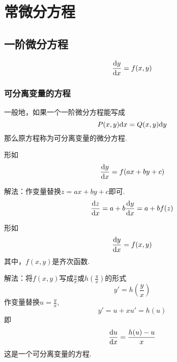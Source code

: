 \chapter{常微分方程}
\section{一阶微分方程}
\sj
\begin{equation}
	\frac{{\rm{d}} y}{{\rm{d}} x}=f(x,y)
\end{equation} 
\subsection{可分离变量的方程}
\sj
一般地，如果一个一阶微分方程能写成
\begin{equation}
	P(x,y){\rm{d}} x=Q(x,y) {\rm{d}} y
\end{equation}
那么原方程称为可分离变量的微分方程.

\example[可分离变量的方程1]
形如
\begin{equation}
	\frac{{\rm{d}} y}{{\rm{d}} x}=f(ax+by+c)
\end{equation}
\par 解法：作变量替换$z=ax+by+c$即可.
\begin{equation}
	\frac{{\rm{d}} z}{{\rm{d}} x}=a+b\frac{{\rm{d}} y}{{\rm{d}} x}=a+bf(z)
\end{equation}

\example[可分离变量的方程2]
形如
\begin{equation}
	\frac{{\rm{d}} y}{{\rm{d}} x}=f(x,y)
\end{equation}
其中，$f(x,y)$是齐次函数.
\par 解法：将$f(x,y)$写成$\displaystyle \frac{y}{x}$或$\displaystyle h\left( \frac{y}{x}\right) $的形式
\begin{equation}
	y'=h(\frac{y}{x})
\end{equation}
作变量替换$\displaystyle u=\frac{y}{x}$,
\begin{equation}
	y'=u+xu'=h(u)
\end{equation}
即
\begin{equation}
	\frac{{\rm{d}} u}{{\rm{d}} x}=\frac{h(u)-u}{x}
\end{equation}
这是一个可分离变量的方程.
\newpage 

